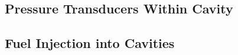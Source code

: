 \subsection{Pressure Transducers Within Cavity}

\subsection{Fuel Injection into Cavities}




\newpage


